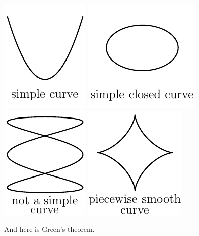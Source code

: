 \begin{wfig}
\begin{center}
    \includegraphics{curve1.pdf}\qquad
    \includegraphics{curve2.pdf}\qquad
    \includegraphics{curve3.pdf}\qquad
    \includegraphics{astroid5.pdf}
\end{center}
\end{wfig}
And here is Green's theorem.


